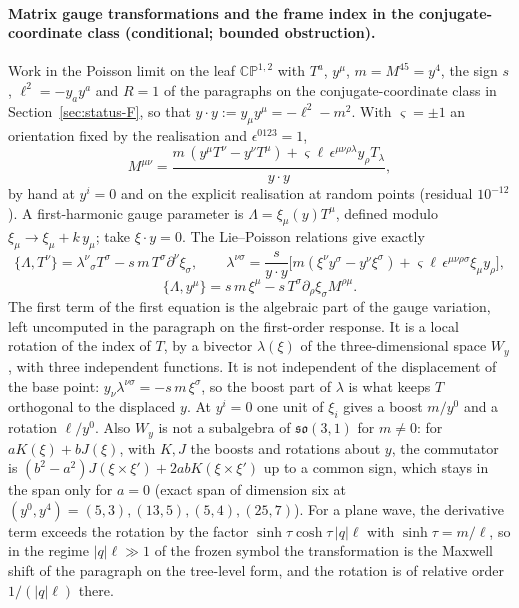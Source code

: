\paragraph{Matrix gauge transformations and the frame index in the conjugate-coordinate class (conditional; bounded obstruction).}
Work in the Poisson limit on the leaf \(\mathbb{CP}^{1,2}\) with \(T^a\), \(y^\mu\), \(m=M^{45}=y^4\), the sign \(s\), \(\ell^2=-y_ay^a\) and \(R=1\) of the paragraphs on the conjugate-coordinate class in Section~\ref{sec:status-F}, so that \(y\cdot y:=y_\mu y^\mu=-\ell^2-m^2\). With \(\varsigma=\pm1\) an orientation fixed by the realisation and \(\epsilon^{0123}=1\),
\[
M^{\mu\nu}=\frac{m\,(y^\mu T^\nu-y^\nu T^\mu)+\varsigma\ell\,\epsilon^{\mu\nu\rho\lambda}y_\rho T_\lambda}{y\cdot y},
\]
by hand at \(y^i=0\) and on the explicit realisation at random points (residual \(10^{-12}\)). A first-harmonic gauge parameter is \(\Lambda=\xi_\mu(y)T^\mu\), defined modulo \(\xi_\mu\to\xi_\mu+k\,y_\mu\); take \(\xi\cdot y=0\). The Lie--Poisson relations give exactly
\[
\{\Lambda,T^\nu\}=\lambda^\nu{}_\sigma T^\sigma-s\,m\,T^\sigma\partial^\nu\xi_\sigma,\qquad
\lambda^{\nu\sigma}=\frac{s}{y\cdot y}\bigl[m(\xi^\nu y^\sigma-y^\nu\xi^\sigma)+\varsigma\ell\,\epsilon^{\mu\nu\rho\sigma}\xi_\mu y_\rho\bigr],
\]
\[
\{\Lambda,y^\mu\}=s\,m\,\xi^\mu-s\,T^\sigma\partial_\rho\xi_\sigma M^{\rho\mu}.
\]
The first term of the first equation is the algebraic part of the gauge variation, left uncomputed in the paragraph on the first-order response. It is a local rotation of the index of \(T\), by a bivector \(\lambda(\xi)\) of the three-dimensional space \(W_y\), with three independent functions. It is not independent of the displacement of the base point: \(y_\nu\lambda^{\nu\sigma}=-s\,m\,\xi^\sigma\), so the boost part of \(\lambda\) is what keeps \(T\) orthogonal to the displaced \(y\). At \(y^i=0\) one unit of \(\xi_i\) gives a boost \(m/y^0\) and a rotation \(\ell/y^0\). Also \(W_y\) is not a subalgebra of \(\mathfrak{so}(3,1)\) for \(m\neq0\): for \(aK(\xi)+bJ(\xi)\), with \(K,J\) the boosts and rotations about \(y\), the commutator is \((b^2-a^2)J(\xi\times\xi')+2abK(\xi\times\xi')\) up to a common sign, which stays in the span only for \(a=0\) (exact span of dimension six at \((y^0,y^4)=(5,3),(13,5),(5,4),(25,7)\)). For a plane wave, the derivative term exceeds the rotation by the factor \(\sinh\tau\cosh\tau\,|q|\ell\) with \(\sinh\tau=m/\ell\), so in the regime \(|q|\ell\gg1\) of the frozen symbol the transformation is the Maxwell shift of the paragraph on the tree-level form, and the rotation is of relative order \(1/(|q|\ell)\) there.

